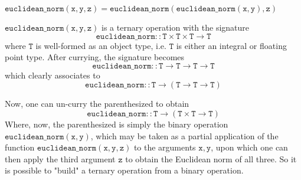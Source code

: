 \begin{Lemma}
    $\mathtt{euclidean\_norm(x, y, z) = euclidean\_norm(euclidean\_norm(x, y), z)}$
\end{Lemma}

\begin{solution}
    $\mathtt{euclidean\_norm(x, y, z)}$ is a ternary operation with the signature
    $$\mathtt{euclidean\_norm :: T \times T \times T \rightarrow T}$$
    where $\mathtt{T}$ is well-formed as an object type, i.e. $\mathtt{T}$ is either an integral or floating
    point type. After currying, the signature becomes
    $$\mathtt{euclidean\_norm :: T \rightarrow T \rightarrow T \rightarrow T}$$
    which clearly associates to
    $$\mathtt{euclidean\_norm :: T \rightarrow \left(T \rightarrow T \rightarrow T\right)}$$

    Now, one can un-curry the parenthesized to obtain
    $$\mathtt{euclidean\_norm :: T \rightarrow \left(T \times T \rightarrow T\right)}$$
    Where, now, the parenthesized is simply the binary operation $\mathtt{euclidean\_norm(x, y)}$, which may
    be taken as a partial application of the function $\mathtt{euclidean\_norm(x,y,z)}$ to the arguments
    $\mathtt{x, y}$, upon which one can then apply the third argument $\mathtt{z}$ to obtain the Euclidean norm
    of all three. So it is possible to "build" a ternary operation from a binary operation.
\end{solution}